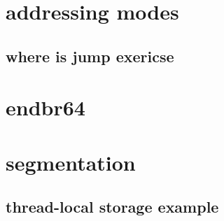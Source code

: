 \section{addressing modes} %



\subsection{where is jump exericse}



\section{endbr64}



\section{segmentation}


\subsection{thread-local storage example}


